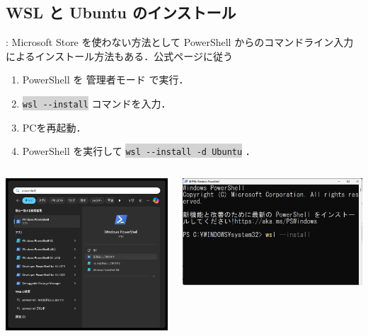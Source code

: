 \documentclass[aspectratio=169,dvipdfmx,cjk]{beamer}
\newcommand{\cmdline}[1]{
    \colorbox{lightgray}{\lstinline[style=command]{#1}}
}
\newcommand{\blue}[1]{ {\color{blue} #1} }
\begin{document}
\subsection*{WSL と Ubuntu のインストール}
\begin{frame}{\insertsection \thesubsection: \insertsubsection}\label{appendix:wsl}
  Microsoft Store を使わない方法として PowerShell からのコマンドライン入力によるインストール方法もある．公式ページ\cite{WSL}に従う
  \begin{enumerate}
    \item PowerShell を\blue{管理者モード}で実行．
    \item \cmdline{wsl --install} コマンドを入力．
    \item PCを再起動．
    \item PowerShell を実行して \cmdline{wsl --install -d Ubuntu}．
  \end{enumerate}
  \begin{columns}
    \begin{column}{0.3\textwidth}
        \includegraphics[width=1.0\linewidth]{fig/powershell.png}
    \end{column}
    \begin{column}{0.5\textwidth}
      \includegraphics[width=1.0\linewidth]{fig/wsl-install.png}

\end{column}
\end{columns}
\end{frame}
\end{document}
